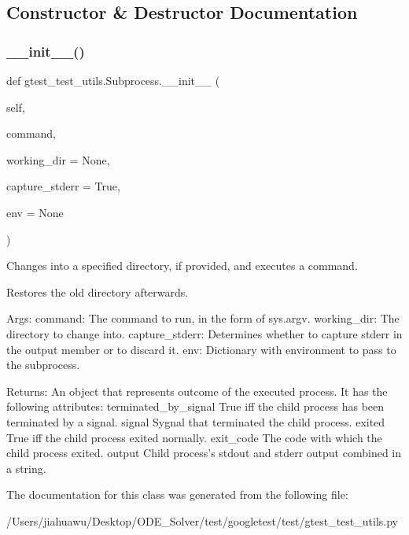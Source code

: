 \subsection{Constructor \& Destructor Documentation}
\mbox{\label{classgtest__test__utils_1_1_subprocess_a452a9e7d9988cc96e71b6fa09bbaddca}} 
\subsubsection{\texorpdfstring{\+\_\+\+\_\+init\+\_\+\+\_\+()}{\_\_init\_\_()}}
{\footnotesize\ttfamily def gtest\+\_\+test\+\_\+utils.\+Subprocess.\+\_\+\+\_\+init\+\_\+\+\_\+ (\begin{DoxyParamCaption}\item[{}]{self,  }\item[{}]{command,  }\item[{}]{working\+\_\+dir = {\ttfamily None},  }\item[{}]{capture\+\_\+stderr = {\ttfamily True},  }\item[{}]{env = {\ttfamily None} }\end{DoxyParamCaption})}

\begin{DoxyVerb}Changes into a specified directory, if provided, and executes a command.

Restores the old directory afterwards.

Args:
  command:        The command to run, in the form of sys.argv.
  working_dir:    The directory to change into.
  capture_stderr: Determines whether to capture stderr in the output member
              or to discard it.
  env:            Dictionary with environment to pass to the subprocess.

Returns:
  An object that represents outcome of the executed process. It has the
  following attributes:
terminated_by_signal   True iff the child process has been terminated
                       by a signal.
signal                 Sygnal that terminated the child process.
exited                 True iff the child process exited normally.
exit_code              The code with which the child process exited.
output                 Child process's stdout and stderr output
                       combined in a string.
\end{DoxyVerb}
 

The documentation for this class was generated from the following file\+:\begin{DoxyCompactItemize}
\item 
/\+Users/jiahuawu/\+Desktop/\+O\+D\+E\+\_\+\+Solver/test/googletest/test/gtest\+\_\+test\+\_\+utils.\+py\end{DoxyCompactItemize}
